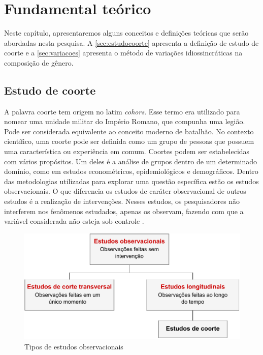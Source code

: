 \chapter{Fundamental teórico}
Neste capítulo, apresentaremos alguns conceitos e definições teóricas que serão abordadas nesta pesquisa. A \autoref{sec:estudocoorte} apresenta a definição de estudo de coorte e a \autoref{sec:variacoes} apresenta o método de variações idiossincráticas na composição de gênero.

\section{Estudo de coorte}
\label{sec:estudocoorte}
A palavra coorte tem origem no latim \textit{cohors}. Esse termo era utilizado para nomear uma unidade militar do Império Romano, que compunha uma legião. Pode ser considerada equivalente ao conceito moderno de batalhão. No contexto científico, uma coorte pode ser definida como um grupo de pessoas que possuem uma característica ou experiência em comum. Coortes podem ser estabelecidas com vários propósitos. Um deles é a análise de grupos dentro de um determinado domínio, como em estudos econométricos, epidemiológicos e demográficos. Dentro das metodologias utilizadas para explorar uma questão específica estão os estudos observacionais. O que diferencia os estudos de caráter observacional de outros estudos é a realização de intervenções. Nesses estudos, os pesquisadores não interferem nos fenômenos estudados, apenas os observam, fazendo com que a variável considerada não esteja sob controle \autocite{Song2010}.

\begin{figure}[h]
\caption{Tipos de estudos observacionais}
\centering
\includegraphics{figuras/Diagrama tipos de estudos observacionais.pdf}
\end{figure}


